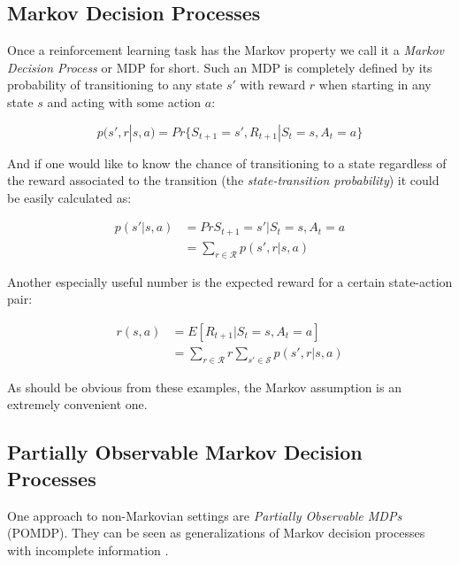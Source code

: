 \subsection{Markov Decision Processes}
\label{sub:markov_decision_processes}
Once a reinforcement learning task has the Markov property
we call it a \textit{Markov Decision Process} or MDP for short.
Such an MDP is completely defined by its probability
of transitioning to any state $s'$ with reward $r$
when starting in any state $s$ and acting with some action $a$:

\begin{equation}
  p(s', r|s, a) = Pr\{S_{t+1}=s', R_{t+1}|S_t=s, A_t=a\}
\end{equation}

And if one would like to know the chance of transitioning to a state
regardless of the reward associated to the transition
(the \textit{state-transition probability})
it could be easily calculated as:

\begin{equation}
  \begin{split}
    p(s'|s, a)
    &= Pr{S_{t+1}=s'|S_t=s, A_t=a} \\
    &= \sum_{r \in \mathcal{R}} p(s', r|s, a)
  \end{split}
\end{equation}

Another especially useful number is the expected reward
for a certain state-action pair:

\begin{equation}
  \begin{split}
    r(s, a)
    &= E[R_{t+1} | S_t = s, A_t = a] \\
    &= \sum_{r \in \mathcal{R}}r \sum_{s' \in \mathcal{S}} p(s', r|s, a)
  \end{split}
\end{equation}

As should be obvious from these examples,
the Markov assumption
is an extremely convenient one.

\subsection{Partially Observable Markov Decision Processes}
\label{sub:pomdp}
One approach to non-Markovian settings
are \textit{Partially Observable MDPs} (POMDP).
They can be seen as generalizations of Markov decision processes
with incomplete information
\parencite{lovejoy1991survey}.

